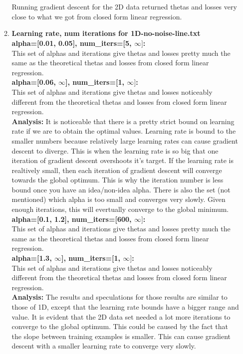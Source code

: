 \documentclass[12pt]{article}
\begin{document}
\begin{enumerate}
\begin{enumerate}
	\\ \\ Running gradient descent for the 2D data returned thetas and losses very close to what we got from closed form linear regression.
	\item \textbf{Learning rate, num iterations for 1D-no-noise-line.txt}
	\\ \textbf{alpha=[0.01, 0.05], num\_iters=[5, $\infty]$:}
	\\ This set of alphas and iterations give thetas and losses pretty much the same as the theoretical thetas and losses from closed form linear regression.
	\\ \textbf{alpha=[0.06, $\infty$], num\_iters=[1, $\infty]$:}
	\\ This set of alphas and iterations give thetas and losses noticeably different from the theoretical thetas and losses from closed form linear regression.
	\\ \textbf{Analysis:} It is noticeable that there is a pretty strict bound on learning rate if we are to obtain the optimal values. Learning rate is bound to the smaller numbers because relatively large learning rates can cause gradient descent to diverge. This is when the learning rate is so big that one iteration of gradient descent overshoots it's target. If the learning rate is realtively small, then each iteration of gradient descent will converge towards the global optimum. This is why the iteration number is less bound once you have an idea/non-idea alpha. There is also the set (not mentioned) which alpha is too small and converges very slowly. Given enough iterations, this will evertually converge to the global minimum. 
	\\ \textbf{alpha=[0.1, 1.2], num\_iters=[600, $\infty]$:}
	\\ This set of alphas and iterations give thetas and losses pretty much the same as the theoretical thetas and losses from closed form linear regression.
	\\ \textbf{alpha=[1.3, $\infty$], num\_iters=[1, $\infty]$:}
	\\ This set of alphas and iterations give thetas and losses noticeably different from the theoretical thetas and losses from closed form linear regression.
	\\ \textbf{Analysis:} The results and speculations for those results are similar to those of 1D, except that the learning rate bounds have a bigger range and value. It is evident that the 2D data set needed a lot more  iterations to converge to the global optimum. This could be caused by the fact that the slope between training examples is smaller. This can cause gradient descent with a smaller learning rate to converge very slowly. 

\end{enumerate}
\end{enumerate}
\end{document}
